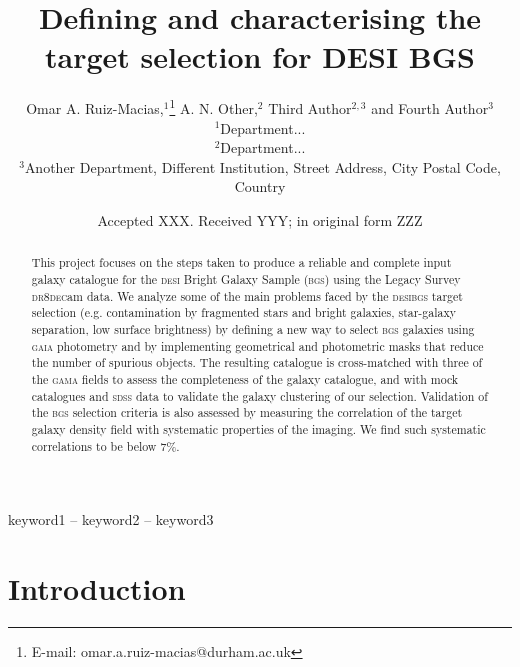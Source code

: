 \documentclass[fleqn,usenatbib]{mnras}
\title[Short title, max. 45 characters]{Defining and characterising the target selection for DESI BGS}
\author[Omar A. Ruiz-Macias et al.]{
Omar A. Ruiz-Macias,$^{1}$\thanks{E-mail: omar.a.ruiz-macias@durham.ac.uk}
A. N. Other,$^{2}$
Third Author$^{2,3}$
and Fourth Author$^{3}$
\\
$^{1}$Department...\\
$^{2}$Department...\\
$^{3}$Another Department, Different Institution, Street Address, City Postal Code, Country
}
\date{Accepted XXX. Received YYY; in original form ZZZ}
\newcommand{\BGS}{\textsc{bgs}\xspace}
\newcommand{\DECam}{\textsc{dec}am\xspace}
\newcommand{\DESI}{\textsc{desi}\xspace}
\newcommand{\DReight}{\textsc{dr8}\xspace}
\newcommand{\GAMA}{\textsc{gama}\xspace}
\newcommand{\GAIA}{\textsc{gaia}\xspace}
\newcommand{\SDSS}{\textsc{sdss}\xspace}
\begin{document}
\label{firstpage}
\pagerange{\pageref{firstpage}--\pageref{lastpage}}
\maketitle

\begin{abstract}
This project focuses on the steps taken to produce a reliable and complete input galaxy catalogue for the \DESI Bright Galaxy Sample (\BGS) using the Legacy Survey \DReight \DECam data. We analyze some of the main problems faced by the \DESI \BGS target selection 
(e.g. contamination by fragmented stars and bright galaxies, star-galaxy separation, low surface brightness) by defining a new way to select \BGS galaxies using \GAIA photometry and by implementing geometrical and photometric masks that reduce the number of spurious objects. The resulting catalogue is cross-matched with three of the \GAMA fields to assess the completeness of the galaxy catalogue, and with mock catalogues and \SDSS data to validate the galaxy clustering of our selection. Validation of the \BGS selection criteria is also assessed by measuring the correlation of the target galaxy density field with systematic properties of the imaging.  We find such systematic correlations to be below $7\%$.
\end{abstract}



\begin{keywords}
keyword1 -- keyword2 -- keyword3
\end{keywords}



\section{Introduction}\label{sec:intro} %
\end{document}
